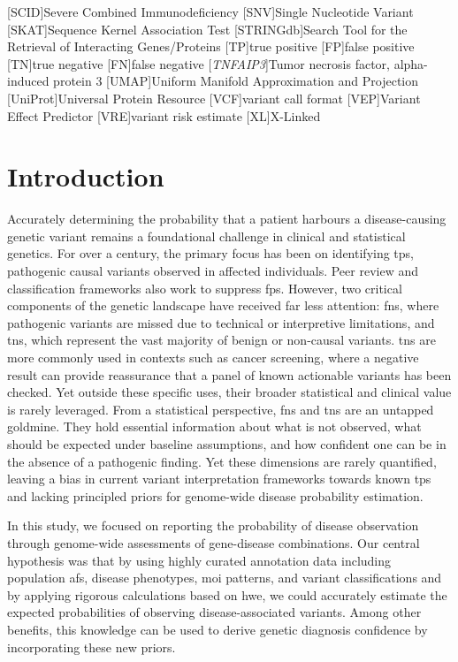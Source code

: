 \begin{acronym}
 [SCID]{Severe Combined Immunodeficiency}
 [SNV]{Single Nucleotide Variant}
 [SKAT]{Sequence Kernel Association Test}
 [STRINGdb]{Search Tool for the Retrieval of Interacting Genes/Proteins}
 [TP]{true positive}
[FP]{false positive}
[TN]{true negative}
[FN]{false negative}
[\textit{TNFAIP3}]{Tumor necrosis factor, alpha-induced protein 3}
 [UMAP]{Uniform Manifold Approximation and Projection}
 [UniProt]{Universal Protein Resource} 
 [VCF]{variant call format}
 [VEP]{Variant Effect Predictor}
 [VRE]{variant risk estimate}
 [XL]{X-Linked}
\end{acronym}

\section{Introduction}

Accurately determining the probability that a patient harbours a disease-causing genetic variant remains a foundational challenge in clinical and statistical genetics. For over a century, the primary focus has been on identifying \ac{tp}s, pathogenic causal variants observed in affected individuals. 
Peer review and classification frameworks also work to suppress \ac{fp}s.
However, two critical components of the genetic landscape have received far less attention: \ac{fn}s, where pathogenic variants are missed due to technical or interpretive limitations, and \ac{tn}s, which represent the vast majority of benign or non-causal variants. 
\ac{tn}s are more commonly used in contexts such as cancer screening, where a negative result can provide reassurance that a panel of known actionable variants has been checked. Yet outside these specific uses, their broader statistical and clinical value is rarely leveraged.
From a statistical perspective, \ac{fn}s and \ac{tn}s are an untapped goldmine. 
They hold essential information about what is not observed, what should be expected under baseline assumptions, and how confident one can be in the absence of a pathogenic finding. 
Yet these dimensions are rarely quantified, leaving a bias in current variant interpretation frameworks towards known \ac{tp}s and lacking principled priors for genome-wide disease probability estimation.

In this study, we focused on reporting the probability of disease observation through genome-wide assessments of gene-disease combinations. 
Our central hypothesis was that by using highly curated annotation data including population \ac{af}s, disease phenotypes, \ac{moi} patterns, and variant classifications and by applying rigorous calculations based on \ac{hwe}, we could accurately estimate the expected probabilities of observing disease-associated variants.
Among other benefits, this knowledge can be used to derive genetic diagnosis confidence by incorporating these new priors.

